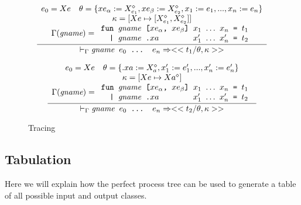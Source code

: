 \documentclass[10pt]{../sigplanconf}
\newcommand{\nfrac}[2]{\frac{\displaystyle{#1}}{\displaystyle{#2}}}
\begin{document}
\begin{figure}
  \begin{equation}
    \nfrac{
      \begin{array}{c}
        e_0 = Xe \quad \theta = \{ xe_\alpha := X_{e_1}^\diamond, xe_\beta := X_{e_2}^\diamond, x_1 := e_1, ..., x_n := e_n \} \\
        \kappa = [Xe \mapsto [X_{e_1}^\diamond, X_{e_2}^\diamond]] \\
        \Gamma(\textit{gname}) =
        \begin{array}{l}
          \texttt{fun \textit{\rmfamily gname} [$xe_\alpha$, $xe_\beta$] $x_1$ $\ldots$ $x_n$ = $t_1$} \\
          \texttt{\ \ | \textit{\rmfamily gname}\ \texttt{.}$xa$ \hspace{1.1cm} $x_1'$ $\ldots$ $x_n'$ = $t_2$} \\
        \end{array}
      \end{array}
    }{
      |-_\Gamma \texttt{\textit{\rmfamily gname} $e_0$ ... $e_n$} => <<t_1 / \theta, \kappa>>
    }
  \end{equation}

  \begin{equation}
    \nfrac{
      \begin{array}{c}
        e_0 = Xe \quad \theta = \{ .xa := X_{a}^\diamond, x_1' := e_1', ..., x_n' := e_n' \} \\
        \kappa = [Xe \mapsto Xa^\diamond] \\
        \Gamma(\textit{gname}) =
        \begin{array}{l}
          \texttt{fun \textit{\rmfamily gname} [$xe_\alpha$, $xe_\beta$] $x_1$ $\ldots$ $x_n$ = $t_1$} \\
          \texttt{\ \ | \textit{\rmfamily gname}\ \texttt{.}$xa$ \hspace{1.1cm} $x_1'$ $\ldots$ $x_n'$ = $t_2$} \\
        \end{array}
      \end{array}
    }{
      |-_\Gamma \texttt{\textit{\rmfamily gname} $e_0$ ... $e_n$} => <<t_2 / \theta, \kappa>>
    }
  \end{equation}

  \caption{Tracing}
  \label{fig:tracing}
\end{figure}



\subsection{Tabulation}
Here we will explain how the perfect process tree can be used to
generate a table of all possible input and output classes.
\end{document}
